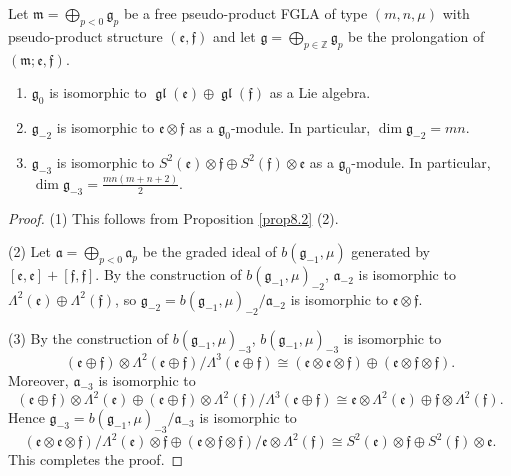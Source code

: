 \documentclass[pdftex]{sigma}
\numberwithin{equation}{section}
\numberwithin{theorem}{section}
\numberwithin{proposition}{section}
\numberwithin{lemma}{section}
\numberwithin{corollary}{section}
\numberwithin{definition}{section}
\numberwithin{example}{section}
\numberwithin{remark}{section}
\numberwithin{note}{section}
\newcommand{\gl}{\operatorname{\mathfrak{gl}}}
\newcommand{\gla}[1]{\mathfrak#1=\bigoplus\limits_{p\in\mathbb Z}\mathfrak#1_p} \renewcommand{\labelenumi}{{\rm (\arabic{enumi})}}
\begin{document}
\begin{proposition}\label{prop8.3} Let $\mathfrak m=\bigoplus\limits_{p<0}\mathfrak g_p$ be a
free pseudo-product FGLA of type $(m,n,\mu)$
with pseudo-product structure $(\mathfrak e,\mathfrak f)$
and let
$\gla g$ be the prolongation of $(\mathfrak m;\mathfrak e,\mathfrak f)$.
\begin{enumerate}\itemsep=0pt
\item
$\mathfrak g_0$ is isomorphic to $\gl(\mathfrak e)\oplus\gl(\mathfrak f)$ as
a Lie algebra.
\item $\mathfrak g_{-2}$ is isomorphic to $\mathfrak e\otimes \mathfrak f$
as a $\mathfrak g_0$-module. In particular,
$\dim\mathfrak g_{-2}=mn$.
\item $\mathfrak g_{-3}$ is isomorphic to
$S^2(\mathfrak e)\otimes
\mathfrak f\oplus S^2(\mathfrak f)\otimes \mathfrak e$
as a $\mathfrak g_0$-module.
In particular,
$\dim\mathfrak g_{-3}=\frac{mn(m+n+2)}2$.
\end{enumerate}
\end{proposition}

\begin{proof} (1) This follows from Proposition \ref{prop8.2} (2).
\par
(2) Let $\mathfrak a=\bigoplus\limits_{p<0}\mathfrak a_p$ be the graded ideal
of $b(\mathfrak g_{-1},\mu)$ generated by
$[\mathfrak e,\mathfrak e]+[\mathfrak f,\mathfrak f]$.
By the construction of $b(\mathfrak g_{-1},\mu)_{-2}$,
$\mathfrak a_{-2}$ is isomorphic to $\Lambda^2(\mathfrak e)\oplus
\Lambda^2(\mathfrak f)$, so
$\mathfrak g_{-2}=b(\mathfrak g_{-1},\mu)_{-2}/\mathfrak a_{-2}$
is isomorphic to $\mathfrak e\otimes \mathfrak f$.

(3) By the construction of $b(\mathfrak g_{-1},\mu)_{-3}$,
$b(\mathfrak g_{-1},\mu)_{-3}$ is isomorphic to
\[
(\mathfrak e\oplus \mathfrak f)\otimes \Lambda^2(\mathfrak e\oplus \mathfrak f)/\Lambda^3(\mathfrak e\oplus \mathfrak f)\cong
(\mathfrak e\otimes \mathfrak e\otimes \mathfrak f)
\oplus
(\mathfrak e\otimes \mathfrak f\otimes \mathfrak f).
\]
Moreover,
$\mathfrak a_{-3}$ is isomorphic to
\[
(\mathfrak e\oplus \mathfrak f)\otimes \Lambda^2(\mathfrak e)
\oplus(\mathfrak e\oplus \mathfrak f)\otimes \Lambda^2(\mathfrak f)/
\Lambda^3(\mathfrak e\oplus \mathfrak f)
\cong \mathfrak e\otimes\Lambda^2(\mathfrak e)\oplus
\mathfrak f\otimes\Lambda^2(\mathfrak f).
\]
Hence
$\mathfrak g_{-3}=b(\mathfrak g_{-1},\mu)_{-3}/\mathfrak a_{-3}$
is isomorphic to
\[
(\mathfrak e\otimes \mathfrak e\otimes \mathfrak f)/
\Lambda^2(\mathfrak e)\otimes\mathfrak f\oplus
(\mathfrak e\otimes \mathfrak f\otimes \mathfrak f)/
\mathfrak e\otimes\Lambda^2(\mathfrak f)
\cong
S^2(\mathfrak e)\otimes
\mathfrak f\oplus S^2(\mathfrak f)\otimes \mathfrak e.
\]
This completes the proof.
\end{proof}
\end{document}
